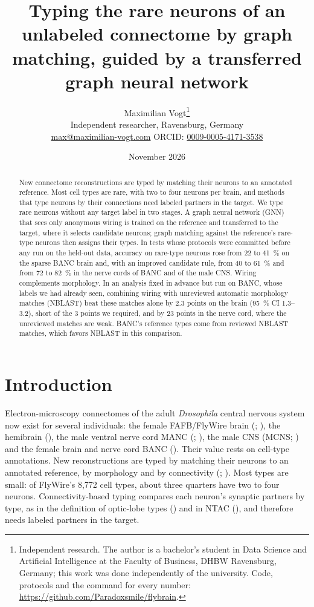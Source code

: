 \documentclass[11pt,a4paper]{article}
\title{Typing the rare neurons of an unlabeled connectome by graph matching, guided by a transferred graph neural network}
\author{Maximilian Vogt\thanks{Independent research. The author is a bachelor's student in Data Science and Artificial Intelligence at the Faculty of Business, DHBW Ravensburg, Germany; this work was done independently of the university. Code, protocols and the command for every number:
\url{https://github.com/Paradoxsmile/flybrain}.}\\[0.3em]
{\small Independent researcher, Ravensburg, Germany}\\
{\small \href{mailto:max@maximilian-vogt.com}{max@maximilian-vogt.com} \quad ORCID: \href{https://orcid.org/0009-0005-4171-3538}{0009-0005-4171-3538}}}
\date{November 2026}
\begin{document}
\maketitle
\begin{abstract}

New connectome reconstructions are typed by matching their neurons to an annotated reference. Most cell types are rare, with two to four neurons per brain, and methods that type neurons by their connections need labeled partners in the target. We type rare neurons without any target label in two stages. A graph neural network (GNN) that sees only anonymous wiring is trained on the reference and transferred to the target, where it selects candidate neurons; graph matching against the reference's rare-type neurons then assigns their types. In tests whose protocols were committed before any run on the held-out data, accuracy on rare-type neurons rose from 22 to 41~\% on the sparse BANC brain and, with an improved candidate rule, from 40 to 61~\% and from 72 to 82~\% in the nerve cords of BANC and of the male CNS. Wiring complements morphology. In an analysis fixed in advance but run on BANC, whose labels we had already seen, combining wiring with unreviewed automatic morphology matches (NBLAST) beat these matches alone by 2.3 points on the brain (95~\% CI 1.3–3.2), short of the 3 points we required, and by 23 points in the nerve cord, where the unreviewed matches are weak. BANC's reference types come from reviewed NBLAST matches, which favors NBLAST in this comparison.

\end{abstract}

\section{Introduction}\label{sec:intro}

Electron-microscopy connectomes of the adult \emph{Drosophila} central nervous system now exist for several individuals: the female FAFB/FlyWire brain (\citealp{dorkenwald2024}; \citealp{schlegel2024}), the hemibrain (\citealp{scheffer2020}), the male ventral nerve cord MANC (\citealp{takemura2024}; \citealp{marin2024}), the male CNS (MCNS; \citealp{berg2026}) and the female brain and nerve cord BANC (\citealp{bates2026}). Their value rests on cell-type annotations. New reconstructions are typed by matching their neurons to an annotated reference, by morphology and by connectivity (\citealp{schlegel2024}; \citealp{bates2026}). Most types are small: of FlyWire's 8,772 cell types, about three quarters have two to four neurons. Connectivity-based typing compares each neuron's synaptic partners by type, as in the definition of optic-lobe types (\citealp{matsliah2024}) and in NTAC (\citealp{schwartzman2026}), and therefore needs labeled partners in the target.
\end{document}
